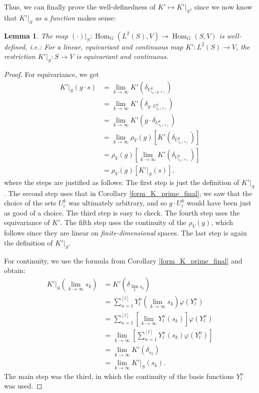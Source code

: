 \documentclass[12pt, a4paper]{article}
\theoremstyle{plain}
\newtheorem{lem}[pro]{Lemma}
\theoremstyle{definition}
\theoremstyle{remark}
\DeclareMathOperator{\Hom}{Hom}
\begin{document}
Thus, we can finally prove the well-definedness of $K' \mapsto K'|_S$, since we now know that $K'|_S$ \emph{as a function} makes sense:

\begin{lem}\label{well-definedness_other_direction}
The map $(\cdot)|_S: \Hom_G(L^2(S), V) \to \Hom_G(S, V)$ is well-defined, i.e.: For a linear, equivariant and continuous map $K': L^2(S) \to V$, the restriction $K'|_S: S \to V$ is equivariant and continuous.
\end{lem}

\begin{proof}
For equivariance, we get
\begin{align*}
K'|_S(g \cdot s) & = \lim_{k \to \infty} K'\left(\delta_{U_{i_k(g \cdot s)}^k}\right) \\
& = \lim_{k \to \infty} K'\left(\delta_{g \cdot U_{i_k(s)}^k}\right) \\
& = \lim_{k \to \infty} K'\left(g \cdot \delta_{U_{i_k(s)}^k}\right) \\
& = \lim_{k \to \infty} \rho_V(g) \left[ K'\left(\delta_{U_{i_k(s)}^k}\right)\right] \\
& = \rho_V(g) \left[ \lim_{k \to \infty} K'\left(\delta_{U_{i_k(s)}^k}\right)\right] \\
& = \rho_V(g) \left[ K'|_S(s)\right],
\end{align*}
where the steps are justified as follows: The first step is just the definition of $K'|_S$. The second step uses that in Corollary \ref{form_K_prime_final}, we saw that the choice of the sets $U_i^k$ was ultimately arbitrary, and so $g \cdot U_{i}^k$ would have been just as good of a choice. The third step is easy to check. The fourth step uses the equivariance of $K'$. The fifth step uses the continuity of the $\rho_V(g)$, which follows since they are linear on \emph{finite-dimensional} spaces. The last step is again the definition of $K'|_S$.

For continuity, we use the formula from Corollary \ref{form_K_prime_final} and obtain:
\begin{align*}
K'|_S\left( \lim_{k \to \infty} s_k\right) & = K'\left( \delta_{\lim_k s_k}\right) \\
& = \sum_{n = 1}^{[l]} Y_l^n\left(\lim_{k \to \infty} s_k\right) \varphi(Y_l^n) \\
& = \sum_{n = 1}^{[l]} \left[ \lim_{k \to \infty} Y_l^n(s_k)\right] \varphi(Y_l^n) \\
& = \lim_{k \to \infty} \left[ \sum_{n = 1}^{[l]} Y_l^n(s_k) \varphi(Y_l^n)\right] \\
& = \lim_{k \to \infty} K'\left(\delta_{s_k}\right) \\
& = \lim_{k \to \infty} K'|_S(s_k).
\end{align*}
The main step was the third, in which the continuity of the basis functions $Y_l^n$ was used.
\end{proof}
\end{document}
